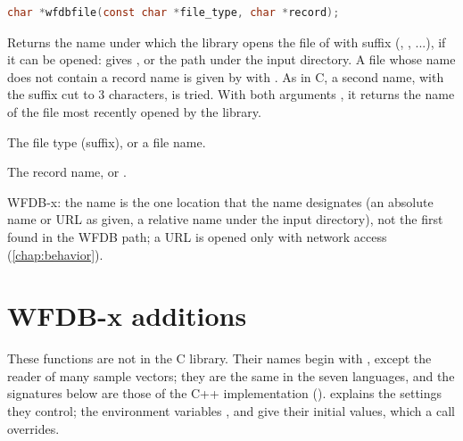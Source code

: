 \begin{lstlisting}[language=C,style=signature]
char *wfdbfile(const char *file_type, char *record);
\end{lstlisting}
Returns the name under which the library opens the file of 
with suffix  (, , ...), if it can be
opened:  gives , or the path
under the input directory. A file whose name does not contain a record name
is given by  with  . As in C, a
second name, with the suffix cut to 3 characters, is tried. With both
arguments , it returns the name of the file most recently opened
by the library.
\begin{params}
\item[file\_type] The file type (suffix), or a file name.
\item[record] The record name, or .
\end{params}

WFDB-x: the name is the one location that the name designates (an absolute
name or URL as given, a relative name under the input directory), not the
first found in the WFDB path; a URL is opened only with network access
(\cref{chap:behavior}).

\section{WFDB-x additions}
\label{sec:library-additions}

These functions are not in the C library. Their names begin with
, except the reader of many sample vectors; they are the same
in the seven languages, and the signatures below are those of the C++
implementation (). 
explains the settings they control; the environment variables
,  and 
give their initial values, which a call overrides.

